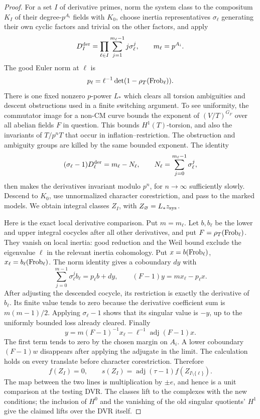 \begin{proof}
For a set \(I\) of derivative primes, norm the system class to the
compositum \(K_I\) of their degree-\(p^{A_i}\) fields with \(K_0\),
choose inertia representatives \(\sigma_\ell\) generating their
own cyclic factors and trivial on the other factors, and apply
\[
 D_I^{\rm der}=\prod_{\ell\in I}
                 \sum_{j=1}^{m_\ell-1}j\sigma_\ell^j,
 \qquad m_\ell=p^{A_i}.
\]
The good Euler norm at \(\ell\) is
\[
 p_\ell=\ell^{-1}\det(1-\rho_T(\operatorname{Frob}_\ell)).
\]
There is one fixed nonzero \(p\)-power \(L_*\) which clears all
torsion ambiguities and descent obstructions used in a finite
switching argument.  To see uniformity, the commutator image for
a non-CM curve bounds the exponent of \((V/T)^{G_F}\) over all
abelian fields \(F\) in question.  This bounds \(H^1(T)\)-torsion,
and also the invariants of \(T/p^nT\) that occur in
inflation--restriction.  The obstruction and ambiguity groups
are killed by the same bounded exponent.  The identity
\[
 (\sigma_\ell-1)D_\ell^{\rm der}=m_\ell-N_\ell,
 \qquad N_\ell=\sum_{j=0}^{m_\ell-1}\sigma_\ell^j,
\]
then makes the derivatives invariant modulo \(p^n\), for
\(n\to\infty\) sufficiently slowly.  Descend to \(K_0\), use
unnormalized character corestriction, and pass to the marked
models.  We obtain integral classes \(Z_I\), with
\(Z_\varnothing=L_*z_{\rm sys}\).

Here is the exact local derivative comparison.  Put \(m=m_\ell\).
Let \(b,b_\ell\)
be the lower and upper integral cocycles after all other
derivatives, and put \(F=\rho_T(\operatorname{Frob}_\ell)\).  They vanish on
local inertia: good reduction and the Weil bound exclude the
eigenvalue \(\ell\) in the relevant inertia cohomology.  Put
\(x=b(\operatorname{Frob}_\ell)\), \(x_\ell=b_\ell(\operatorname{Frob}_\ell)\).  The norm
identity gives a coboundary \(dy\) with
\[
 \sum_{j=0}^{m-1}\sigma_\ell^jb_\ell=p_\ell b+dy,
 \qquad (F-1)y=mx_\ell-p_\ell x.
\]
After adjusting the descended cocycle, its restriction is exactly
the derivative of \(b_\ell\).  Its finite value tends to zero
because the derivative coefficient sum is \(m(m-1)/2\).  Applying
\(\sigma_\ell-1\) shows that its singular value is \(-y\), up
to the uniformly bounded loss already cleared.  Finally
\[
 y=m(F-1)^{-1}x_\ell-\ell^{-1}\operatorname{adj}(F-1)x.
\]
The first term tends to zero by the chosen margin on \(A_i\).
A lower coboundary \((F-1)w\) disappears after applying the
adjugate in the limit.  The calculation holds on every translate
before character corestriction.  Therefore
\begin{equation}\label{single:finite-singular}
 f(Z_I)=0,\qquad
 s(Z_I)=\operatorname{adj}(\tau-1)f(Z_{I\setminus\{\ell\}}).
\end{equation}
The map between the two lines is multiplication by \(\pm e\),
and hence is a unit comparison at the testing DVR.  The classes
lift to the complexes with the new conditions; the inclusion of
\(H^0\) and the vanishing of the old singular quotients' \(H^1\)
give the claimed lifts over the DVR itself.


\end{proof}
